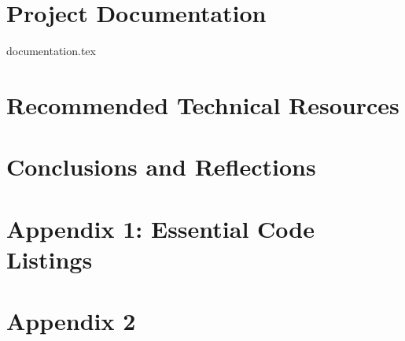 \documentclass[onecolumn, draftclsnofoot,10pt, compsoc]{IEEEtran}
\begin{document}
	\section{Project Documentation}
	{documentation.tex}
	
	\section{Recommended Technical Resources}
	
	\section{Conclusions and Reflections}
	\section{Appendix 1: Essential Code Listings}
	\section{Appendix 2}
	
	
	
	
	
\end{document}
